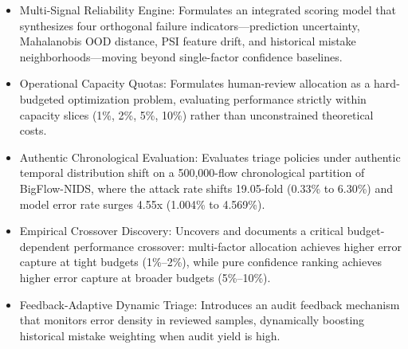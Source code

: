 \begin{itemize}
\item Multi-Signal Reliability Engine: Formulates an integrated scoring model that synthesizes four orthogonal failure indicators---prediction uncertainty, Mahalanobis OOD distance, PSI feature drift, and historical mistake neighborhoods---moving beyond single-factor confidence baselines.
\item Operational Capacity Quotas: Formulates human-review allocation as a hard-budgeted optimization problem, evaluating performance strictly within capacity slices (1\%, 2\%, 5\%, 10\%) rather than unconstrained theoretical costs.
\item Authentic Chronological Evaluation: Evaluates triage policies under authentic temporal distribution shift on a 500,000-flow chronological partition of BigFlow-NIDS, where the attack rate shifts 19.05-fold (0.33\% to 6.30\%) and model error rate surges 4.55x (1.004\% to 4.569\%).
\item Empirical Crossover Discovery: Uncovers and documents a critical budget-dependent performance crossover: multi-factor allocation achieves higher error capture at tight budgets (1\%--2\%), while pure confidence ranking achieves higher error capture at broader budgets (5\%--10\%).
\item Feedback-Adaptive Dynamic Triage: Introduces an audit feedback mechanism that monitors error density in reviewed samples, dynamically boosting historical mistake weighting when audit yield is high.
\end{itemize}

